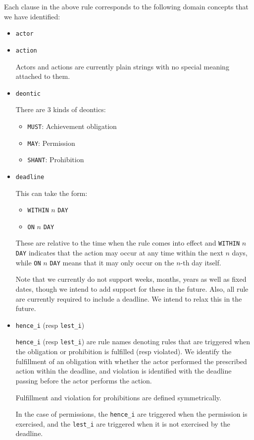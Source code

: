 \documentclass{article}
\begin{document}
Each clause in the above rule corresponds to the following
domain concepts that we have identified:
\begin{itemize}
  \item \texttt{actor}
  \item \texttt{action}

  Actors and actions are currently plain strings with no special meaning
  attached to them.
  
  \item \texttt{deontic}

  There are 3 kinds of deontics:
  \begin{itemize}
    \item \texttt{MUST}: Achievement obligation
    \item \texttt{MAY}: Permission
    \item \texttt{SHANT}: Prohibition
  \end{itemize}

  \item \texttt{deadline}

  This can take the form:
  \begin{itemize}
    \item \texttt{WITHIN} $n$ \texttt{DAY}
    \item \texttt{ON} $n$ \texttt{DAY}
  \end{itemize}

  These are relative to the time when the rule comes into effect and
  \texttt{WITHIN} $n$ \texttt{DAY} indicates that the action may occur at any
  time within the next $n$ days, while \texttt{ON} $n$ \texttt{DAY} means that it
  may only occur on the $n$-th day itself.

  Note that we currently do not support weeks, months, years as well as fixed
  dates, though we intend to add support for these in the future.
  Also, all rule are currently required to include a deadline.
  We intend to relax this in the future.

  \item \texttt{hence\_i} (resp \texttt{lest\_i})

  \texttt{hence\_i} (resp \texttt{lest\_i}) are rule names denoting rules that
  are triggered when the obligation or prohibition is fulfilled (resp violated).
  We identify the fulfillment of an obligation with whether the actor performed
  the prescribed action within the deadline, and violation is identified with
  the deadline passing before the actor performs the action.

  Fulfillment and violation for prohibitions are defined symmetrically.


  In the case of permissions, the \texttt{hence\_i} are triggered when the
  permission is exercised, and the \texttt{lest\_i} are triggered when it
  is not exercised by the deadline. 
\end{itemize}
\end{document}
